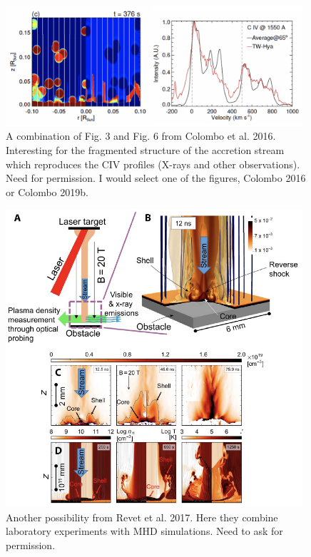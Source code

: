 \begin{figure}
    \centering
    \includegraphics[width=11cm]{figs/colombo2016.png}
    \caption{A combination of Fig. 3 and Fig. 6 from Colombo et al. 2016. Interesting for the fragmented structure of the accretion stream which reproduces the CIV profiles (X-rays and other observations). Need for permission. I would select one of the figures, Colombo 2016 or Colombo 2019b.}
    \label{fig:colombo2016}
\end{figure}

\begin{figure}
    \centering
    \includegraphics[width=11cm]{figs/Revet2017.png}
    \caption{Another possibility from Revet et al. 2017. Here they combine laboratory experiments with MHD simulations. Need to ask for permission.}
    \label{fig:revet2017}
\end{figure}